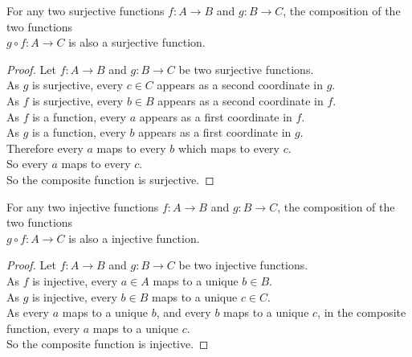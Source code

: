 \documentclass[../notes.tex]{subfiles}
\begin{document}
			\begin{theorem}
				For any two surjective functions $f: A \rightarrow B$ and $g: B \rightarrow C$, the composition of the two functions\\
					$g \circ f: A \rightarrow C$ is also a surjective function.
					\begin{proof}
						Let $f: A \rightarrow B$ and $g: B \rightarrow C$ be two surjective functions.\\
						As $g$ is surjective, every $c \in C$ appears as a second coordinate in $g$.\\
						As $f$ is surjective, every $b \in B$ appears as a second coordinate in $f$.\\
						As $f$ is a function, every $a$ appears as a first coordinate in $f$.\\
						As $g$ is a function, every $b$ appears as a first coordinate in $g$.\\
						Therefore every $a$ maps to every $b$ which maps to every $c$.\\
						So every $a$ maps to every $c$.\\
						So the composite function is surjective.
					\end{proof}
			\end{theorem}
			\begin{theorem}
				For any two injective functions $f: A \rightarrow B$ and $g: B \rightarrow C$, the composition of the two functions\\
					$g \circ f: A \rightarrow C$ is also a injective function.
					\begin{proof}
						Let $f: A \rightarrow B$ and $g: B \rightarrow C$ be two injective functions.\\
						As $f$ is injective, every $a \in A$ maps to a unique $b \in B$.\\
						As $g$ is injective, every $b \in B$ maps to a unique $c \in C$.\\
						As every $a$ maps to a unique $b$, and every $b$ maps to a unique $c$, in the composite function, every $a$ maps to a unique $c$.\\
						So the composite function is injective.
					\end{proof}
			\end{theorem}
\end{document}
